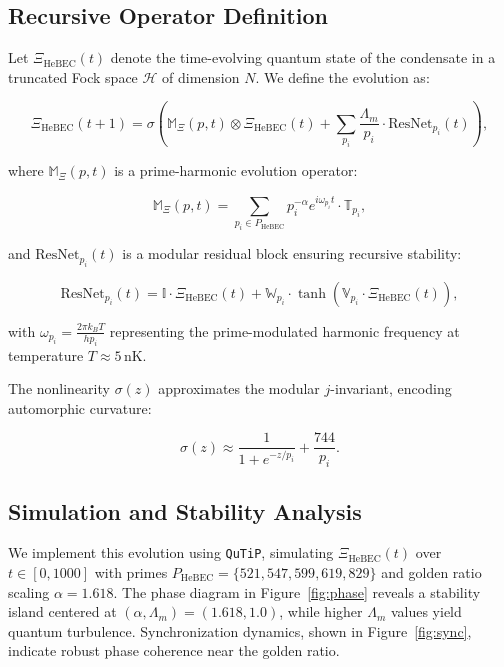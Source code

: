 \documentclass{article}
\theoremstyle{plain}
\begin{document}
\subsection{Recursive Operator Definition}

Let $\Xi_{\text{HeBEC}}(t)$ denote the time-evolving quantum state of the condensate in a truncated Fock space $\mathcal{H}$ of dimension $N$. We define the evolution as:

\begin{equation}
\Xi_{\text{HeBEC}}(t+1) = \sigma\left( \mathbb{M}_\Xi(p, t) \otimes \Xi_{\text{HeBEC}}(t) + \sum_{p_i} \frac{\Lambda_m}{p_i} \cdot \text{ResNet}_{p_i}(t) \right),
\label{eq:qnn-evolution}
\end{equation}

where $\mathbb{M}_\Xi(p, t)$ is a prime-harmonic evolution operator:

\begin{equation}
\mathbb{M}_\Xi(p, t) = \sum_{p_i \in P_{\text{HeBEC}}} p_i^{-\alpha} e^{i \omega_{p_i} t} \cdot \mathbb{T}_{p_i},
\end{equation}

and $\text{ResNet}_{p_i}(t)$ is a modular residual block ensuring recursive stability:

\begin{equation}
\text{ResNet}_{p_i}(t) = \mathbb{I} \cdot \Xi_{\text{HeBEC}}(t) + \mathbb{W}_{p_i} \cdot \tanh(\mathbb{V}_{p_i} \cdot \Xi_{\text{HeBEC}}(t)),
\end{equation}

with $\omega_{p_i} = \frac{2\pi k_B T}{h p_i}$ representing the prime-modulated harmonic frequency at temperature $T \approx 5\,\text{nK}$.

The nonlinearity $\sigma(z)$ approximates the modular $j$-invariant, encoding automorphic curvature:

\begin{equation}
\sigma(z) \approx \frac{1}{1 + e^{-z/p_i}} + \frac{744}{p_i}.
\end{equation}

\subsection{Simulation and Stability Analysis}

We implement this evolution using \texttt{QuTiP}, simulating $\Xi_{\text{HeBEC}}(t)$ over $t \in [0, 1000]$ with primes $P_{\text{HeBEC}} = \{521, 547, 599, 619, 829\}$ and golden ratio scaling $\alpha = 1.618$. The phase diagram in Figure~\ref{fig:phase} reveals a stability island centered at $(\alpha, \Lambda_m) = (1.618, 1.0)$, while higher $\Lambda_m$ values yield quantum turbulence. Synchronization dynamics, shown in Figure~\ref{fig:sync}, indicate robust phase coherence near the golden ratio.
\end{document}
